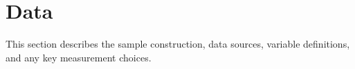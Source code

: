 \section{Data} \label{sec:data}

This section describes the sample construction, data sources, variable definitions, and any key measurement choices.
